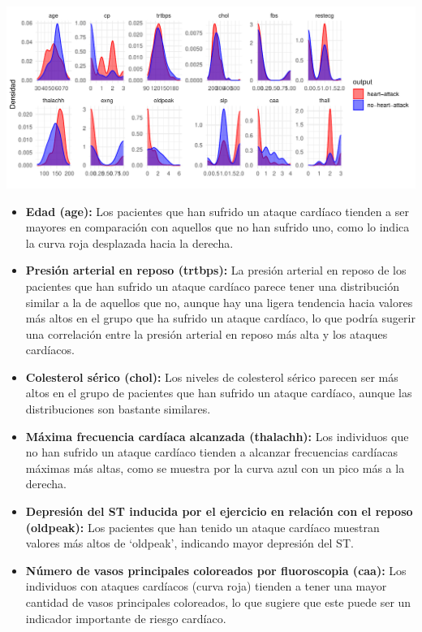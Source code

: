 \documentclass[
]{article}
\begin{document}
\includegraphics{coyolaf_ChristianOyola-PRA2_files/figure-latex/unnamed-chunk-20-1.pdf}

\begin{itemize}
\item
  \textbf{Edad (age):} Los pacientes que han sufrido un ataque cardíaco
  tienden a ser mayores en comparación con aquellos que no han sufrido
  uno, como lo indica la curva roja desplazada hacia la derecha.
\item
  \textbf{Presión arterial en reposo (trtbps):} La presión arterial en
  reposo de los pacientes que han sufrido un ataque cardíaco parece
  tener una distribución similar a la de aquellos que no, aunque hay una
  ligera tendencia hacia valores más altos en el grupo que ha sufrido un
  ataque cardíaco, lo que podría sugerir una correlación entre la
  presión arterial en reposo más alta y los ataques cardíacos.
\item
  \textbf{Colesterol sérico (chol):} Los niveles de colesterol sérico
  parecen ser más altos en el grupo de pacientes que han sufrido un
  ataque cardíaco, aunque las distribuciones son bastante similares.
\item
  \textbf{Máxima frecuencia cardíaca alcanzada (thalachh):} Los
  individuos que no han sufrido un ataque cardíaco tienden a alcanzar
  frecuencias cardíacas máximas más altas, como se muestra por la curva
  azul con un pico más a la derecha.
\item
  \textbf{Depresión del ST inducida por el ejercicio en relación con el
  reposo (oldpeak):} Los pacientes que han tenido un ataque cardíaco
  muestran valores más altos de `oldpeak', indicando mayor depresión del
  ST.
\item
  \textbf{Número de vasos principales coloreados por fluoroscopia
  (caa):} Los individuos con ataques cardíacos (curva roja) tienden a
  tener una mayor cantidad de vasos principales coloreados, lo que
  sugiere que este puede ser un indicador importante de riesgo cardíaco.
\end{itemize}
\end{document}
